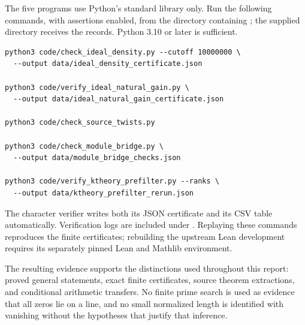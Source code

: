The five programs use Python's standard library only. Run the
following commands, with assertions enabled, from the directory
containing ; the supplied  directory
receives the records. Python 3.10 or later is sufficient.

\begin{minipage}{\textwidth}
\begin{verbatim}
python3 code/check_ideal_density.py --cutoff 10000000 \
  --output data/ideal_density_certificate.json

python3 code/verify_ideal_natural_gain.py \
  --output data/ideal_natural_gain_certificate.json

python3 code/check_source_twists.py

python3 code/check_module_bridge.py \
  --output data/module_bridge_checks.json

python3 code/verify_ktheory_prefilter.py --ranks \
  --output data/ktheory_prefilter_rerun.json
\end{verbatim}
\end{minipage}

The character verifier writes both its JSON certificate and its CSV
table automatically. Verification logs are included under
. Replaying these commands reproduces the
finite certificates; rebuilding the upstream Lean development
requires its separately pinned Lean and Mathlib environment.

The resulting evidence supports the distinctions used throughout
this report: proved general statements, exact finite certificates,
source theorem extractions, and conditional arithmetic transfers.
No finite prime search is used as evidence that all zeros lie on a
line, and no small normalized length is identified with vanishing
without the hypotheses that justify that inference.

